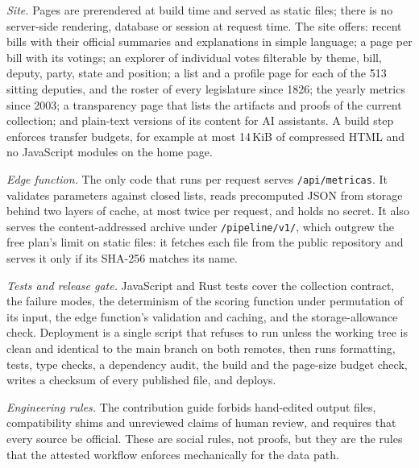 \emph{Site.} Pages are prerendered at build time and served as static files; there is no server-side rendering, database or session at request time. The site offers: recent bills with their official summaries and explanations in simple language; a page per bill with its votings; an explorer of individual votes filterable by theme, bill, deputy, party, state and position; a list and a profile page for each of the 513 sitting deputies, and the roster of every legislature since 1826; the yearly metrics since 2003; a transparency page that lists the artifacts and proofs of the current collection; and plain-text versions of its content for AI assistants. A build step enforces transfer budgets, for example at most 14\,KiB of compressed HTML and no JavaScript modules on the home page.

\emph{Edge function.} The only code that runs per request serves \texttt{/api/metricas}. It validates parameters against closed lists, reads precomputed JSON from storage behind two layers of cache, at most twice per request, and holds no secret. It also serves the content-addressed archive under \texttt{/pipeline/v1/}, which outgrew the free plan's limit on static files: it fetches each file from the public repository and serves it only if its SHA-256 matches its name.

\emph{Tests and release gate.} JavaScript and Rust tests cover the collection contract, the failure modes, the determinism of the scoring function under permutation of its input, the edge function's validation and caching, and the storage-allowance check. Deployment is a single script that refuses to run unless the working tree is clean and identical to the main branch on both remotes, then runs formatting, tests, type checks, a dependency audit, the build and the page-size budget check, writes a checksum of every published file, and deploys.

\emph{Engineering rules.} The contribution guide forbids hand-edited output files, compatibility shims and unreviewed claims of human review, and requires that every source be official. These are social rules, not proofs, but they are the rules that the attested workflow enforces mechanically for the data path.
